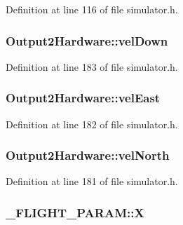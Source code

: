 Definition at line 116 of file simulator.\-h.

\hypertarget{group___h_i_t_l_plugin_ga9d5ac871d0c0845dcd9363069268c2d3}{
\subsubsection[{vel\-Down}]{ Output2\-Hardware\-::vel\-Down}}\label{group___h_i_t_l_plugin_ga9d5ac871d0c0845dcd9363069268c2d3}


Definition at line 183 of file simulator.\-h.

\hypertarget{group___h_i_t_l_plugin_gae7889fb60f991558b83af5aef685a35f}{
\subsubsection[{vel\-East}]{ Output2\-Hardware\-::vel\-East}}\label{group___h_i_t_l_plugin_gae7889fb60f991558b83af5aef685a35f}


Definition at line 182 of file simulator.\-h.

\hypertarget{group___h_i_t_l_plugin_gaa20e34957a2badaea5d07a49ab029182}{
\subsubsection[{vel\-North}]{ Output2\-Hardware\-::vel\-North}}\label{group___h_i_t_l_plugin_gaa20e34957a2badaea5d07a49ab029182}


Definition at line 181 of file simulator.\-h.

\hypertarget{group___h_i_t_l_plugin_ga55a42deedc5785d55c570ae908bcc46a}{
\subsubsection[{X}]{ \-\_\-\-F\-L\-I\-G\-H\-T\-\_\-\-P\-A\-R\-A\-M\-::\-X}}\label{group___h_i_t_l_plugin_ga55a42deedc5785d55c570ae908bcc46a}


